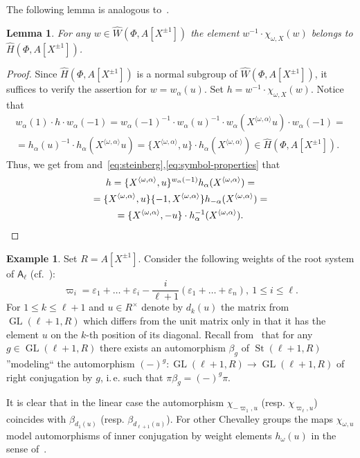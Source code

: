\documentclass[oneside, 10pt]{amsart}
\DeclareMathOperator{\St}{St}
\DeclareMathOperator{\GL}{GL}
\newcommand{\rA}{\mathsf{A}}
\newcommand{\StW}{\widehat{W}}
\newcommand{\StH}{\widehat{H}}
\numberwithin{equation}{section}
\numberwithin{thm}{section}
\newtheorem{lemma}[thm]{Lemma}
\numberwithin{lemma}{section}
\theoremstyle{definition}
\newtheorem{example}[lemma]{Example}
\theoremstyle{remark}
\begin{document}
The following lemma is analogous to~\cite[Lemma~3.1(c)]{Tu83}.
\begin{lemma} \label{lem:winv-chiw}
For any $w \in \StW(\Phi, A[X^{\pm 1}])$ the element $w^{-1} \cdot \chi_{\omega, X}(w)$ belongs to $\StH(\Phi, A[X^{\pm 1}])$.
\end{lemma}
\begin{proof}
Since $\StH(\Phi, A[X^{\pm 1}])$ is a normal subgroup of $\StW(\Phi, A[X^{\pm 1}])$, it suffices to verify the assertion for $w = w_\alpha(u)$.
Set $h = w^{-1} \cdot \chi_{\omega, X}(w)$.
Notice that
\begin{multline*} w_\alpha(1) \cdot h\cdot  w_\alpha(-1) = w_\alpha(-1)^{-1} \cdot w_\alpha(u)^{-1} \cdot w_{\alpha}(X^{\langle \omega, \alpha \rangle} u) \cdot w_\alpha(-1) = \\
= h_\alpha(u)^{-1} \cdot h_\alpha(X^{ \langle \omega, \alpha \rangle }u) = \{ X^{\langle \omega, \alpha \rangle}, u \} \cdot h_\alpha(X^{\langle \omega, \alpha \rangle}) \in \StH(\Phi, A[X^{\pm 1}]).\end{multline*}
Thus, we get from\cite[Lemme~5.2]{Ma69} and~\eqref{eq:steinberg},\eqref{eq:symbol-properties} that
\begin{multline} \label{eq:w-computation} h = \{ X^{\langle \omega, \alpha \rangle}, u \}{}^{w_\alpha(-1)}h_\alpha(X^{\langle \omega, \alpha \rangle}) = \\
= \{ X^{\langle \omega, \alpha \rangle}, u \} \{ -1, X^{\langle \omega, \alpha \rangle} \} h_{-\alpha}(X^{\langle \omega, \alpha \rangle}) = \\
= \{ X^{\langle \omega, \alpha \rangle}, -u \} \cdot h_\alpha^{-1}(X^{\langle \omega, \alpha \rangle}).\qedhere\end{multline}
\end{proof}

\begin{example} \label{exm:chi-linear}
Set $R = A[X^{\pm 1}]$.
Consider the following weights of the root system of $\rA_\ell$ (cf.~\cite[\S~VI.4.7]{Bou}):
\[ \varpi_{i} = \varepsilon_1 + \ldots + \varepsilon_i - \frac{i}{\ell+1}(\varepsilon_1 + \ldots + \varepsilon_n), \ 1 \leq i \leq \ell. \]
For $1\leq k\leq \ell+1$ and $u \in R^\times$ denote by $d_k(u)$ the matrix from $\GL(\ell+1, R)$ which differs from the unit matrix only in that it has the element $u$ on the $k$-th position of its diagonal.
Recall from~\cite[Corollary~4]{Ka77} that for any $g \in \GL(\ell+1, R)$ there exists an automorphism $\beta_g$ of $\St(\ell+1, R)$ ''modeling`` the automorphism $(-)^g \colon \GL(\ell+1, R) \to \GL(\ell+1, R)$ of right conjugation by $g$, i.\,e. such that $\pi \beta_g = (-)^g \pi$.


It is clear that in the linear case the automorphism $\chi_{-\varpi_1, u}$ (resp. $\chi_{\varpi_{\ell}, u}$) coincides with $\beta_{d_1(u)}$ (resp. $\beta_{d_{\ell+1}(u)}$).
For other Chevalley groups the maps $\chi_{\omega, u}$ model automorphisms of inner conjugation by weight elements $h_\omega(u)$ in the sense of~\cite[\S~4]{Vav09}.
\end{example}
\end{document}
